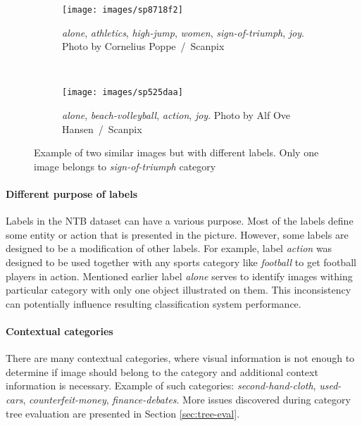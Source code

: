 \begin{figure}[ht!]
    \centering
    \begin{subfigure}[a]{0.3\textwidth}
        \texttt{[image: images/sp8718f2]}
        \caption{\textit{alone}, \textit{athletics}, \textit{high-jump}, \textit{women}, \textit{sign-of-triumph}, \textit{joy}. Photo by Cornelius Poppe~/~Scanpix}
        \label{fig:with-sign-of-triumph}
    \end{subfigure}
    ~
    \begin{subfigure}[a]{0.3\textwidth}
        \texttt{[image: images/sp525daa]}
        \caption{\textit{alone}, \textit{beach-volleyball}, \textit{action}, \textit{joy}. Photo by Alf Ove Hansen~/~Scanpix}
        \label{fig:without-sign-of-triumph}
    \end{subfigure}
    \caption[Example of two similar images but with different labels]{Example of two similar images but with different labels. Only one image belongs to \textit{sign-of-triumph} category}
    \label{fig:sign-of-triumph-example}
\end{figure}

\paragraph{Different purpose of labels}
Labels in the NTB dataset can have a various purpose. Most of the labels define some entity or action that is presented in the picture. However, some labels are designed to be a modification of other labels. For example, label \textit{action} was designed to be used together with any sports category like \textit{football} to get football players in action. Mentioned earlier label \textit{alone} serves to identify images withing particular category with only one object illustrated on them. This inconsistency can potentially influence resulting classification system performance.

\paragraph{Contextual categories}
There are many contextual categories, where visual information is not enough to determine if image should belong to the category and additional context information is necessary. Example of such categories: \textit{second-hand-cloth}, \textit{used-cars}, \textit{counterfeit-money}, \textit{finance-debates}. More issues discovered during category tree evaluation are presented in Section \ref{sec:tree-eval}.

